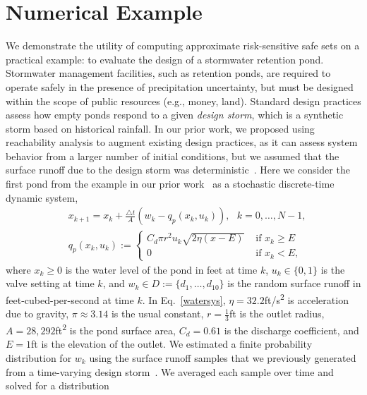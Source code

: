 \documentclass[letterpaper, 10 pt, conference]{ieeeconf}  %
\begin{document}
\section{Numerical Example}
\label{sec::ex}
We demonstrate the utility of computing approximate risk-sensitive safe sets on a practical example:
to evaluate the design of a stormwater retention pond. 
Stormwater management facilities, such as retention ponds, are required to operate safely 
in the presence of precipitation uncertainty, but must be designed within the scope of public resources (e.g., money, land). 
Standard design practices assess how empty ponds respond to a given \textit{design storm},
which is a synthetic storm based on historical rainfall.  
In our prior work, we proposed using reachability analysis to augment existing design practices, as it can assess 
system behavior from a larger number of initial conditions, but we assumed that the surface runoff due to the design storm was deterministic~\cite{sustech}.
Here we consider the first pond from the example in our prior work~\cite{sustech} as a stochastic discrete-time dynamic system,
\begin{equation}\begin{aligned}
& x_{k+1} = x_k + \frac{\triangle t}{A} (w_k - q_p(x_k, u_k)), \text{ }k = 0, \dots, N-1, \\
& q_p(x_k,u_k) := \begin{cases} C_d \pi r^2 u_k \sqrt{ 2\eta(x-E) } & \text{ if } x_k \geq E \\
						0 & \text{ if } x_k < E, \end{cases}
\end{aligned}\label{watersys}\end{equation}
where $x_k \geq 0$ is the water level of the pond in feet at time $k$, $u_k \in \{0, 1\}$ is the valve setting at time $k$,
and $w_k \in D := \{d_1, \dots, d_{10}\}$ is the random surface runoff in feet-cubed-per-second at time $k$.
In Eq.~\eqref{watersys}, $\eta = 32.2$ft/s\textsuperscript{2} is acceleration due to gravity, $\pi \approx 3.14$ is the usual constant, 
$r = \frac{1}{3}$ft is the outlet radius, $A = 28,292$ft\textsuperscript{2} is the pond surface area, $C_d = 0.61$ is the discharge coefficient,
and $E = 1$ft is the elevation of the outlet. %
We estimated a finite probability distribution for $w_k$ using the surface runoff samples that we previously generated from a time-varying design storm~\cite{sustech}. 
We averaged each sample over time and solved for a distribution
\end{document}
